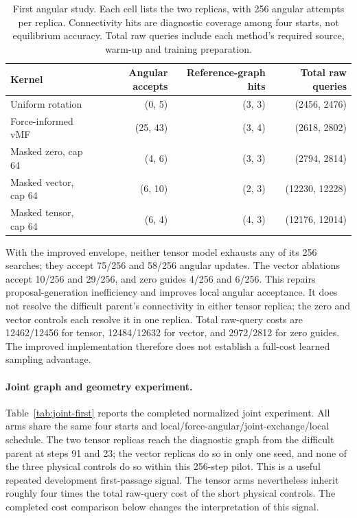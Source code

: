 \begin{table}[t]
\centering\small
\caption{First angular study. Each cell lists the two replicas, with 256 angular
attempts per replica. Connectivity hits
are diagnostic coverage among four starts, not equilibrium accuracy. Total raw
queries include each method's required source, warm-up and training preparation.}
\label{tab:angular-first}
\begin{tabular}{lrrr}
\toprule
Kernel & Angular accepts & Reference-graph hits & Total raw queries\\
\midrule
Uniform rotation & (0, 5) & (3, 3) & (2456, 2476)\\
Force-informed vMF & (25, 43) & (3, 4) & (2618, 2802)\\
Masked zero, cap 64 & (4, 6) & (3, 3) & (2794, 2814)\\
Masked vector, cap 64 & (6, 10) & (2, 3) & (12230, 12228)\\
Masked tensor, cap 64 & (6, 4) & (4, 3) & (12176, 12014)\\
\bottomrule
\end{tabular}
\end{table}

With the improved envelope, neither tensor model exhausts any of its 256 searches;
they accept 75/256 and 58/256 angular updates. The vector ablations accept 10/256 and
29/256, and zero guides 4/256 and 6/256. This repairs proposal-generation inefficiency
and improves local angular acceptance. It does not resolve the difficult parent's
connectivity in either tensor replica; the zero and vector controls each resolve
it in one replica. Total raw-query costs are 12462/12456 for tensor, 12484/12632 for
vector, and 2972/2812 for zero guides. The improved implementation therefore does
not establish a full-cost learned sampling advantage.

\paragraph{Joint graph and geometry experiment.}
Table~\ref{tab:joint-first} reports the completed normalized joint experiment.
All arms share the same four starts and local/force-angular/joint-exchange/local
schedule. The two tensor replicas reach the diagnostic graph from the difficult
parent at steps 91 and 23; the vector replicas do so in only one seed, and none of
the three physical controls do so within this 256-step pilot. This is a useful
repeated development first-passage signal. The tensor arms nevertheless inherit
roughly four times the total raw-query cost of the short physical controls.
The completed cost comparison below changes the interpretation of this signal.

